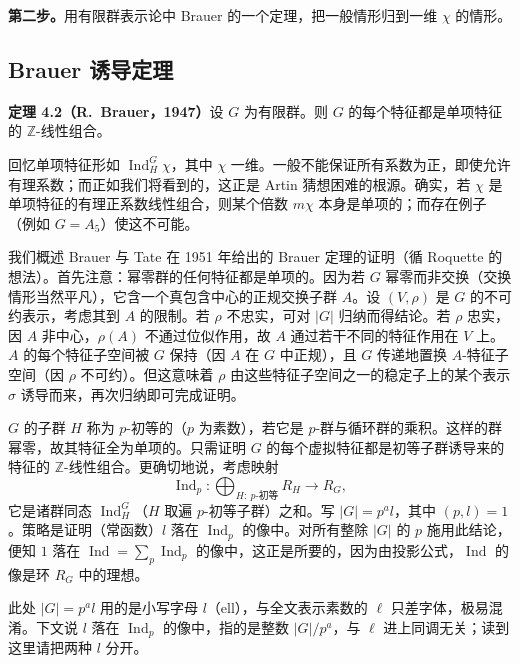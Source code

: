 \textbf{第二步。}用有限群表示论中 Brauer 的一个定理，把一般情形归到一维 $\chi$ 的情形。

\subsection{Brauer 诱导定理}\label{c4:sec:4.4}

\par\medskip\noindent\textbf{定理 4.2（R.~Brauer，1947）}\quad 设 $G$ 为有限群。则 $G$ 的每个特征都是单项特征的 $\mathbb{Z}$-线性组合。

回忆单项特征形如 $\operatorname{Ind}^{G}_{H}\chi$，其中 $\chi$ 一维。一般不能保证所有系数为正，即使允许有理系数；而正如我们将看到的，这正是 Artin 猜想困难的根源。确实，若 $\chi$ 是单项特征的有理正系数线性组合，则某个倍数 $m\chi$ 本身是单项的；而存在例子（例如 $G=A_5$）使这不可能。

我们概述 Brauer 与 Tate 在 1951 年给出的 Brauer 定理的证明（循 Roquette 的想法）。首先注意：幂零群的任何特征都是单项的。因为若 $G$ 幂零而非交换（交换情形当然平凡），它含一个真包含中心的正规交换子群 $A$。设 $(V,\rho)$ 是 $G$ 的不可约表示，考虑其到 $A$ 的限制。若 $\rho$ 不忠实，可对 $|G|$ 归纳而得结论。若 $\rho$ 忠实，因 $A$ 非中心，$\rho(A)$ 不通过位似作用，故 $A$ 通过若干不同的特征作用在 $V$ 上。$A$ 的每个特征子空间被 $G$ 保持（因 $A$ 在 $G$ 中正规），且 $G$ 传递地置换 $A$-特征子空间（因 $\rho$ 不可约）。但这意味着 $\rho$ 由这些特征子空间之一的稳定子上的某个表示 $\sigma$ 诱导而来，再次归纳即可完成证明。

$G$ 的子群 $H$ 称为 $p$-初等的（$p$ 为素数），若它是 $p$-群与循环群的乘积。这样的群幂零，故其特征全为单项的。只需证明 $G$ 的每个虚拟特征都是初等子群诱导来的特征的 $\mathbb{Z}$-线性组合。更确切地说，考虑映射
\begin{equation}\tag{4.8}\label{c4:eq:4.8}
\operatorname{Ind}_p\colon\bigoplus_{H\colon\ p\text{-初等}}R_H\longrightarrow R_G,
\end{equation}
它是诸群同态 $\operatorname{Ind}^{G}_{H}$（$H$ 取遍 $p$-初等子群）之和。写 $|G|=p^{a}l$，其中 $(p,l)=1$。策略是证明（常函数）$l$ 落在 $\operatorname{Ind}_p$ 的像中。对所有整除 $|G|$ 的 $p$ 施用此结论，便知 $1$ 落在 $\operatorname{Ind}=\sum_p\operatorname{Ind}_p$ 的像中，这正是所要的，因为由投影公式，$\operatorname{Ind}$ 的像是环 $R_G$ 中的理想。

\begin{annote}
此处 $|G|=p^{a}l$ 用的是小写字母 $l$（ell），与全文表示素数的 $\ell$ 只差字体，极易混淆。下文说 $l$ 落在 $\operatorname{Ind}_p$ 的像中，指的是整数 $|G|/p^{a}$，与 $\ell$ 进上同调无关；读到这里请把两种 $l$ 分开。
\par\vspace{0.15em}{\raggedleft 【来源：Serre 前引书 Ch.~10（A）；原书第 82 页该处记号如此，译文照录】\par}
\end{annote}

